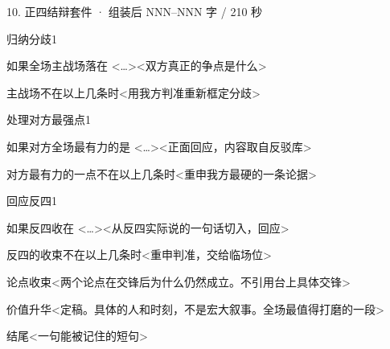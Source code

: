 \begin{kit}{10. 正四结辩}{套件 · 组装后 NNN–NNN 字 / 210 秒}
\begin{pick}{归纳分歧}{1}
\begin{module}{如果全场主战场落在 <…>}<双方真正的争点是什么>\end{module}
\begin{fallback}{主战场不在以上几条时}<用我方判准重新框定分歧>\end{fallback}
\end{pick}
\begin{pick}{处理对方最强点}{1}
\begin{module}{如果对方全场最有力的是 <…>}<正面回应，内容取自反驳库>\end{module}
\begin{fallback}{对方最有力的一点不在以上几条时}<重申我方最硬的一条论据>\end{fallback}
\end{pick}
\begin{pick}{回应反四}{1}
\begin{module}{如果反四收在 <…>}<从反四实际说的一句话切入，回应>\end{module}
\begin{fallback}{反四的收束不在以上几条时}<重申判准，交给临场位>\end{fallback}
\end{pick}
\begin{fixed}{论点收束}<两个论点在交锋后为什么仍然成立。不引用台上具体交锋>\end{fixed}
\begin{fixed}{价值升华}<定稿。具体的人和时刻，不是宏大叙事。全场最值得打磨的一段>\end{fixed}
\begin{fixed}{结尾}<一句能被记住的短句>\end{fixed}
\end{kit}
\begin{contingency}
\end{contingency}

